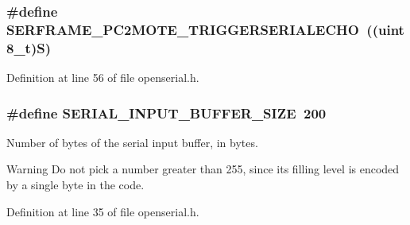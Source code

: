 \subsubsection[{\texorpdfstring{S\+E\+R\+F\+R\+A\+M\+E\+\_\+\+P\+C2\+M\+O\+T\+E\+\_\+\+T\+R\+I\+G\+G\+E\+R\+S\+E\+R\+I\+A\+L\+E\+C\+HO}{SERFRAME_PC2MOTE_TRIGGERSERIALECHO}}]{\setlength{\rightskip}{0pt plus 5cm}\#define S\+E\+R\+F\+R\+A\+M\+E\+\_\+\+P\+C2\+M\+O\+T\+E\+\_\+\+T\+R\+I\+G\+G\+E\+R\+S\+E\+R\+I\+A\+L\+E\+C\+HO~(({\bf uint8\+\_\+t})\textquotesingle{}S\textquotesingle{})}\hypertarget{group___open_serial_gac193711d797092c2e35f2ca3e7947b79}{}\label{group___open_serial_gac193711d797092c2e35f2ca3e7947b79}


Definition at line 56 of file openserial.\+h.

\subsubsection[{\texorpdfstring{S\+E\+R\+I\+A\+L\+\_\+\+I\+N\+P\+U\+T\+\_\+\+B\+U\+F\+F\+E\+R\+\_\+\+S\+I\+ZE}{SERIAL_INPUT_BUFFER_SIZE}}]{\setlength{\rightskip}{0pt plus 5cm}\#define S\+E\+R\+I\+A\+L\+\_\+\+I\+N\+P\+U\+T\+\_\+\+B\+U\+F\+F\+E\+R\+\_\+\+S\+I\+ZE~200}\hypertarget{group___open_serial_ga8221a6836587db0f71d30e1da1c1bab3}{}\label{group___open_serial_ga8221a6836587db0f71d30e1da1c1bab3}


Number of bytes of the serial input buffer, in bytes. 

\begin{DoxyWarning}{Warning}
Do not pick a number greater than 255, since its filling level is encoded by a single byte in the code. 
\end{DoxyWarning}


Definition at line 35 of file openserial.\+h.

